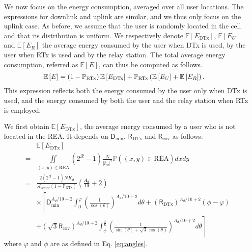 \documentclass[journal]{IEEEtran}
\theoremstyle{definition}
\begin{document}
We now focus on the energy consumption, averaged over all user locations. 
The expressions for downlink and uplink are similar, and we thus only focus on the uplink case.
As before, we assume that the user is randomly located in the cell and that its distribution is uniform.
We respectively denote $\mathbb{E} \left[E_{\text{DTx}}\right]$, $\mathbb{E} \left[E_{U}\right]$ and $\mathbb{E} \left[E_{R}\right]$ the average energy consumed by the user when DTx is used, by the user when RTx is used and by the relay station. The total average energy consumption, referred as $\mathbb{E} \left[E\right]$, can thus be computed as follows. 
\begin{align}
\hspace*{-10pt}\mathbb{E} \left[E\right] = 
\left(1-\mathbb{P}_{\text{RTx}}\right) \mathbb{E} \left[E_{\text{DTx}}\right]
+\mathbb{P}_{\text{RTx}} \left( \mathbb{E} \left[E_{U}\right] + \mathbb{E} \left[E_{R}\right]\right).
\label{eq:energy}
\end{align}
This expression reflects both the energy consumed by the user only when DTx is used, and the energy consumed by both the user and the relay station when RTx is employed.


We first obtain $\mathbb{E} \left[E_{\text{DTx}}\right]$, the average energy consumed by a user who is not located in the REA. It depends on $\mathsf{D}_{\min}$, $\mathsf{R}_{\text{DTx}}$ and $\mathsf{R}_{\text{cov}}$ as follows:
\begin{align}
& \mathbb{E} \left[E_{\text{DTx}}\right]  \nonumber \\
= & \underset{(x,y) \in \overline{\text{REA}}}{\iint} \left(2^{\mathcal{R}}-1\right) \frac{N}{\vert h_d \vert^2} \mathbb{P}\left((x,y) \in \overline{\text{REA}}\right) dx dy \label{eq:ave_energy_dtx}
 \\
= & \frac{2 \left(2^{\mathcal{R}}-1\right)N  K_d } {\mathcal{A}_{\text{sector}} \left(1-\mathbb{P}_{\text{RTx}}\right)}
\left(\frac{A_d}{10} + 2\right)
\nonumber \\ &
 \times \left[
\mathsf{D}_{\min}^{A_d/10+2} 
\int_0^{\varphi}\left(\frac{1}{\cos(\theta)}\right)^{A_d/10+2} d\theta + 
 \left(\mathsf{R}_{\text{DTx}} \right)^{A_d/10+2} \left(\phi - \varphi\right)
 \right. \nonumber \\ 
& \left.
 +
\left(\sqrt{3}\mathsf{R}_{\text{cov}} \right)^{A_d/10+2} 
\int_{\phi}^{\frac{\pi}{6}}\left(\frac{1}{\sin(\theta)+\sqrt{3}\cos(\theta)}\right)^{A_d/10+2} d\theta \right] 
\nonumber 
\end{align}
where $\varphi$ and $\phi$ are as defined in Eq. \eqref{eq:angles}.
\end{document}
